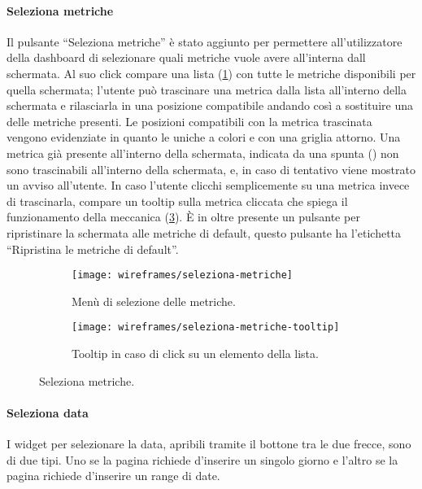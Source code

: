 \paragraph{Seleziona metriche}
Il pulsante ``Seleziona metriche'' è stato aggiunto per permettere all'utilizzatore della dashboard di selezionare quali metriche vuole avere all'interna dall schermata. Al suo click compare una lista (\ref{fig:seleziona-metriche}) con tutte le metriche disponibili per quella schermata; l'utente può trascinare una metrica dalla lista all'interno della schermata e rilasciarla in una posizione compatibile andando così a sostituire una delle metriche presenti. Le posizioni compatibili con la metrica trascinata vengono evidenziate in quanto le uniche a colori e con una griglia attorno. Una metrica già presente all'interno della schermata, indicata da una spunta (\checkmark) non sono trascinabili all'interno della schermata, e, in caso di tentativo viene mostrato un avviso all'utente. In caso l'utente clicchi semplicemente su una metrica invece di trascinarla, compare un tooltip sulla metrica cliccata che spiega il funzionamento della meccanica (\ref{fig:seleziona-metriche-tooltip}). \`E in oltre presente un pulsante per ripristinare la schermata alle metriche di default, questo pulsante ha l'etichetta ``Ripristina le metriche di default''.

\begin{figure}[H]
    \begin{subfigure}[b]{0.5\textwidth}
        \centering
        \texttt{[image: wireframes/seleziona-metriche]}
        \caption{Menù di selezione delle metriche.}
        \label{fig:seleziona-metriche}
    \end{subfigure}
\hfill
    \begin{subfigure}[b]{0.5\textwidth}
        \centering
        \texttt{[image: wireframes/seleziona-metriche-tooltip]}
        \caption{Tooltip in caso di click su un elemento della lista.}
        \label{fig:seleziona-metriche-tooltip}
    \end{subfigure}
    \caption{Seleziona metriche.}
\end{figure}


\paragraph{Seleziona data}
I widget per selezionare la data, apribili tramite il bottone tra le due frecce, sono di due tipi. Uno se la pagina richiede  d'inserire un singolo giorno e l'altro se la pagina richiede d'inserire un range di date.\\

